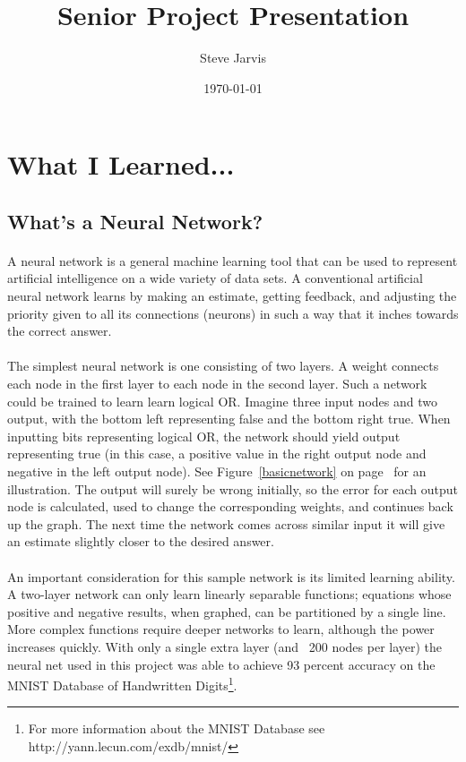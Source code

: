 \documentclass{article}
\title{Senior Project Presentation}
\author{Steve Jarvis}
\date{\today}
\begin{document}
\maketitle

\section{What I Learned...}

\subsection{What's a Neural Network?}

    \paragraph{}A neural network is a general machine learning tool that can be 
    used to represent artificial intelligence on a wide variety of data sets. 
    A conventional artificial neural network learns by making an estimate, getting 
    feedback, and adjusting the priority given to all its connections (neurons) 
    in such a way that it inches towards the correct answer.

    \paragraph{}The simplest neural network is one consisting of two layers. A 
    weight connects each node in the first layer to each node in the second layer.
    Such a network could be trained to learn learn logical OR. Imagine three input 
    nodes and two output, with the bottom left representing false and the bottom 
    right true. When inputting bits representing logical OR, the network should 
    yield output representing true (in this case, a positive value in the right
    output node and negative in the left output node). See 
    Figure~\ref{basicnetwork} on  page~\pageref{basicnetwork} for an 
    illustration. The output will surely be wrong initially, so the error for 
    each output node is calculated, used to change the corresponding weights, 
    and continues back up the graph. The next time the network comes across 
    similar input it will give an estimate slightly closer to the desired answer.

    \paragraph{}An important consideration for this sample network is its limited 
    learning ability. A two-layer network can only learn linearly separable 
    functions; equations whose positive and negative results, when graphed, can 
    be partitioned by a single line. More complex functions require deeper networks
    to learn, although the power increases quickly. With only a single extra 
    layer (and ~200 nodes per layer) the neural net used in this project was able 
    to achieve 93 percent accuracy on the MNIST Database of Handwritten 
    Digits\footnote{For more information about the MNIST Database see
    http://yann.lecun.com/exdb/mnist/}.
\end{document}
